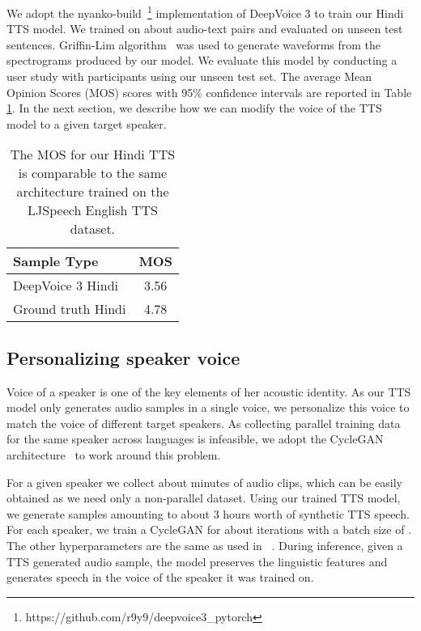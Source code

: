\documentclass[sigconf]{acmart}
\begin{document}
We adopt the {\sc nyanko-build}~\footnote{https://github.com/r9y9/deepvoice3\_pytorch} implementation of DeepVoice 3 to train our Hindi TTS model. We trained on about  audio-text pairs and evaluated on  unseen test sentences. Griffin-Lim algorithm~\cite{griffin1984signal} was used to generate waveforms from the spectrograms produced by our model. We evaluate this model by conducting a user study with  participants using our unseen test set. The average Mean Opinion Scores (MOS) scores with 95\% confidence intervals are reported in Table \ref{tab:mostts}. In the next section, we describe how we can modify the voice of the TTS model to a given target speaker.

\begin{table}[h]
  \begin{tabular}{lc}
    \toprule
    Sample Type & MOS\\
    \midrule
    DeepVoice 3 Hindi & 3.56\\
    Ground truth Hindi & 4.78\\
  \bottomrule
  \end{tabular}
  \caption{The MOS for our Hindi TTS is comparable to the same architecture trained on the LJSpeech English TTS dataset.}
  \label{tab:mostts}
  \vspace{-0.7cm}
\end{table}

\subsection{Personalizing speaker voice}
Voice of a speaker is one of the key elements of her acoustic identity. As our TTS model only generates audio samples in a single voice, we personalize this voice to match the voice of different target speakers. As collecting parallel training data for the same speaker across languages is infeasible, we adopt the CycleGAN architecture~\cite{kaneko2017parallel} to work around this problem.

For a given speaker we collect about  minutes of audio clips, which can be easily obtained as we need only a non-parallel dataset. Using our trained TTS model, we generate  samples amounting to about 3 hours worth of synthetic TTS speech. For each speaker, we train a CycleGAN for about  iterations with a batch size of . The other hyperparameters are the same as used in ~\citet{kaneko2017parallel}. During inference, given a TTS generated audio sample, the model preserves the linguistic features and generates speech in the voice of the speaker it was trained on.
\end{document}
